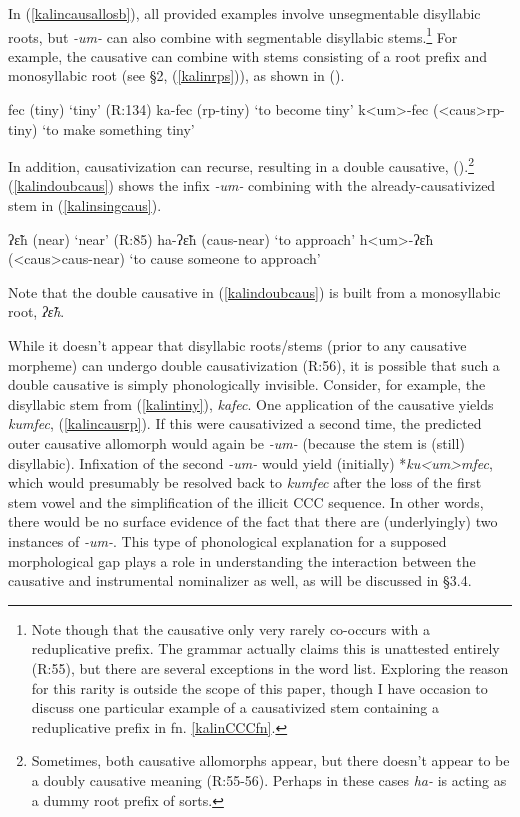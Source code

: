 \documentclass[output=paper,colorlinks,citecolor=brown,
]{langscibook}
\newcounter{nexttmp}    %
\newcommand{\Next}{\setcounter{nexttmp}{\value{equation}}\stepcounter{nexttmp}(\thenexttmp)\xspace}
\begin{document}
In (\ref{kalincausallosb}), all provided examples involve unsegmentable disyllabic roots, but \textit{-um-} can also combine with segmentable disyllabic stems.\footnote{Note though that the causative only very rarely co-occurs with a reduplicative prefix. The grammar actually claims this is unattested entirely (R:55), but there are several exceptions in the word list. Exploring the reason for this rarity is outside the scope of this paper, though I have occasion to discuss one particular example of a causativized stem containing a reduplicative prefix in fn. \ref{kalinCCCfn}.\label{kalinredfn}} For example, the causative can combine with stems consisting of a root prefix and monosyllabic root (see \S2, (\ref{kalinrps})), as shown in \Next.

\ea \ea fec (tiny) \hfill `tiny' (R:134)
\ex ka-fec ({\sc rp}-tiny) \hfill `to become tiny'\label{kalintiny}
\ex\label{kalincausrp} k<um>-fec ({\sc <caus>rp}-tiny) \hfill `to make something tiny'
\z
\z

\noindent In addition, causativization can recurse, resulting in a double causative, \Next.\footnote{Sometimes, both causative allomorphs appear, but there doesn't appear to be a doubly causative meaning (R:55-56). Perhaps in these cases \textit{ha-} is acting as a dummy root prefix of sorts.} (\ref{kalindoubcaus}) 
shows the infix \textit{-um-} combining with the already-causativized stem in (\ref{kalinsingcaus}).%

\ea \ea ʔ\~εh (near) \hfill `near'  (R:85)
\ex ha-ʔ\~εh ({\sc caus-}near) \hfill `to approach'\label{kalinsingcaus}
\ex\label{kalindoubcaus} h<um>-ʔ\~εh ({\sc <caus>caus-}near)  \hfill `to cause someone to approach'
\z
\z

\noindent Note that the double causative in (\ref{kalindoubcaus}) is built from a monosyllabic root, \textit{ʔ\~εh}. 

While it doesn't appear that disyllabic roots/stems (prior to any causative morpheme) can undergo double causativization (R:56), it is possible that such a double causative is simply phonologically invisible. Consider, for example, the disyllabic stem from (\ref{kalintiny}), \textit{kafec}. One application of the causative yields \textit{kumfec}, (\ref{kalincausrp}). If this were causativized a second time, the predicted outer causative allomorph would again be \textit{-um-} (because the stem is (still) disyllabic). Infixation of the second \textit{-um-} would yield (initially) *\textit{ku<um>mfec}, which would presumably be resolved back to \textit{kumfec} after the loss of the first stem vowel and the simplification of the illicit CCC sequence. In other words, there would be no surface evidence of the fact that there are (underlyingly) two instances of \textit{-um-}. This type of phonological explanation for a supposed morphological gap plays a role in understanding the interaction between the causative and instrumental nominalizer as well, as will be discussed in \S3.4.
\end{document}
